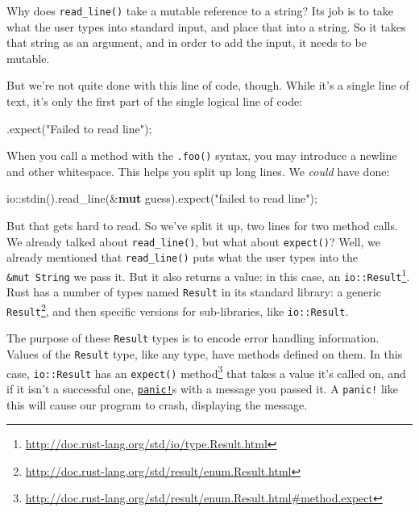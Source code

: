 \documentclass[a4paper,]{book}
\newenvironment{Shaded}{\begin{snugshade}}{\end{snugshade}}
\newcommand{\KeywordTok}[1]{\textcolor[rgb]{0.13,0.29,0.53}{\textbf{{#1}}}}
\newcommand{\StringTok}[1]{\textcolor[rgb]{0.31,0.60,0.02}{{#1}}}
\newcommand{\NormalTok}[1]{{#1}}
\renewcommand{\href}[2]{#2\footnote{\url{#1}}}
\begin{document}
Why does \texttt{read\_line()} take a mutable reference to a string? Its
job is to take what the user types into standard input, and place that
into a string. So it takes that string as an argument, and in order to
add the input, it needs to be mutable.

But we're not quite done with this line of code, though. While it's a
single line of text, it's only the first part of the single logical line
of code:

\begin{Shaded}
\begin{Highlighting}[]
        \NormalTok{.expect(}\StringTok{"Failed to read line"}\NormalTok{);}
\end{Highlighting}
\end{Shaded}

When you call a method with the \texttt{.foo()} syntax, you may
introduce a newline and other whitespace. This helps you split up long
lines. We \emph{could} have done:

\begin{Shaded}
\begin{Highlighting}[]
    \NormalTok{io::stdin().read_line(&}\KeywordTok{mut} \NormalTok{guess).expect(}\StringTok{"failed to read line"}\NormalTok{);}
\end{Highlighting}
\end{Shaded}

But that gets hard to read. So we've split it up, two lines for two
method calls. We already talked about \texttt{read\_line()}, but what
about \texttt{expect()}? Well, we already mentioned that
\texttt{read\_line()} puts what the user types into the
\texttt{\&mut\ String} we pass it. But it also returns a value: in this
case, an
\href{http://doc.rust-lang.org/std/io/type.Result.html}{\texttt{io::Result}}.
Rust has a number of types named \texttt{Result} in its standard
library: a generic
\href{http://doc.rust-lang.org/std/result/enum.Result.html}{\texttt{Result}},
and then specific versions for sub-libraries, like \texttt{io::Result}.

The purpose of these \texttt{Result} types is to encode error handling
information. Values of the \texttt{Result} type, like any type, have
methods defined on them. In this case, \texttt{io::Result} has an
\href{http://doc.rust-lang.org/std/result/enum.Result.html\#method.expect}{\texttt{expect()}
method} that takes a value it's called on, and if it isn't a successful
one, \protect\hyperlink{sec--error-handling}{\texttt{panic!}}s with a
message you passed it. A \texttt{panic!} like this will cause our
program to crash, displaying the message.
\end{document}
